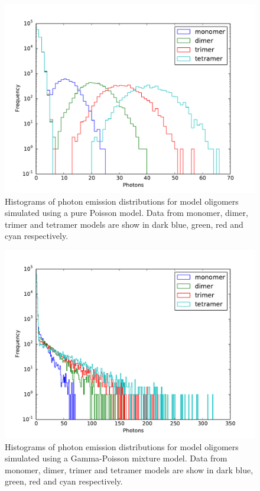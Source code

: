 \begin{figure}
   \begin{center}
      \includegraphics*[clip=true, width=6in]{sizing/poisson_oligomers_log.pdf}
      \caption{Histograms of photon emission distributions for model oligomers simulated using a pure Poisson model. Data from monomer, dimer, trimer and tetramer models are show in dark blue, green, red and cyan respectively.}
      \label{fig:Poisson_oligomers}
   \end{center}
\end{figure}


\begin{figure}
   \begin{center}
      \includegraphics*[clip=true, width=6in]{sizing/gamma_poisson_oligomers_log.pdf}
      \caption{Histograms of photon emission distributions for model oligomers simulated using a Gamma-Poisson mixture model. Data from monomer, dimer, trimer and tetramer models are show in dark blue, green, red and cyan respectively.}
      \label{fig:gamma_Poisson_oligomers}
   \end{center}
\end{figure}


